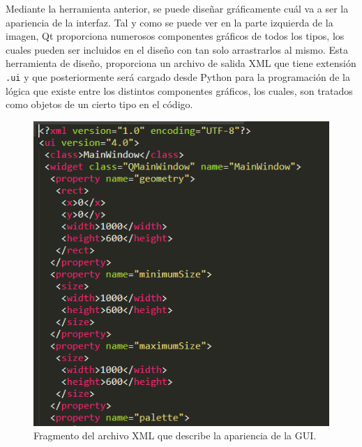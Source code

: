 Mediante la herramienta anterior, se puede diseñar gráficamente cuál va a ser la apariencia de la interfaz. Tal y como se puede ver en la parte izquierda de la imagen, Qt proporciona numerosos componentes gráficos de todos los tipos, los cuales pueden ser incluidos en el diseño con tan solo arrastrarlos al mismo. Esta herramienta de diseño, proporciona un archivo de salida XML que tiene extensión \texttt{.ui} y que posteriormente será cargado desde Python para la programación de la lógica que existe entre los distintos componentes gráficos, los cuales, son tratados como objetos de un cierto tipo en el código.

\begin{figure}[H]
    \centering
    \includegraphics[width=0.55\linewidth]{pictures/XmlGui.PNG}
    \caption{Fragmento del archivo XML que describe la apariencia de la GUI.}
    \label{fig:ui_XML}
\end{figure}

